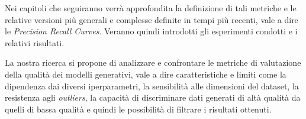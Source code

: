 Nei capitoli che seguiranno verrà approfondita la definizione di tali metriche e le relative versioni più generali e complesse definite in tempi più recenti, vale a dire le \textit{Precision Recall Curves}.
Veranno quindi introdotti gli esperimenti condotti e i relativi risultati.

La nostra ricerca si propone di analizzare e confrontare le metriche di valutazione della qualità dei modelli generativi, 
vale a dire caratteristiche e limiti come la dipendenza dai diversi iperparametri, la sensibilità alle dimensioni del dataset, la resistenza agli \textit{outliers}, 
la capacità di discriminare dati generati di altà qualità da quelli di bassa qualità e quindi le possibilità di filtrare i risultati ottenuti.


